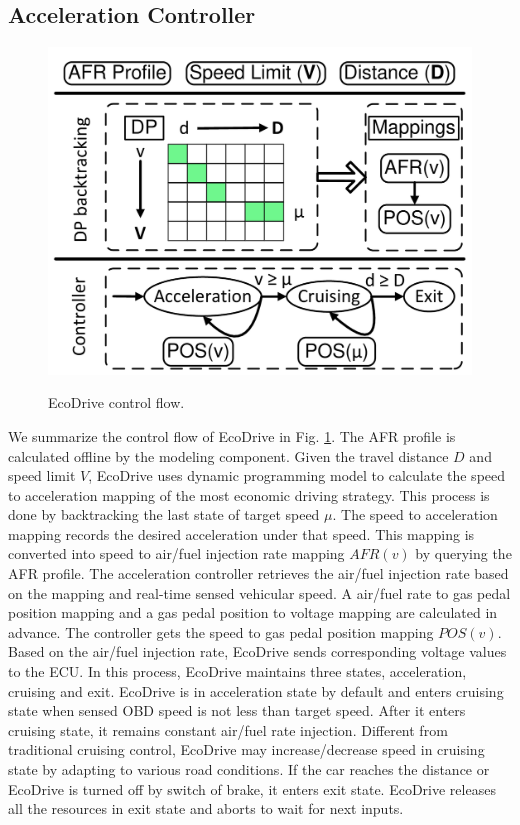 \subsection{Acceleration Controller}


\begin{figure}[ht]
\begin{center}
\vspace{-0.2cm}
\includegraphics[width=4.5in,angle=0]{Figs/EcoDrive/controlflow.pdf}
\vspace{-0.0cm}
\caption{EcoDrive control flow.}
\vspace{-0.5cm}
\label{controlflow}
\end{center}
\end{figure}



We summarize the control flow of EcoDrive in Fig. \ref{controlflow}. 
The AFR profile is calculated offline by the modeling component. 
Given the travel distance $D$ and speed limit $V$, 
EcoDrive uses dynamic programming model to calculate the speed
to acceleration mapping of the most economic driving strategy. 
This process is done by backtracking the last state of target speed $\mu$. 
The speed to acceleration mapping records the desired
acceleration under that speed. 
This mapping is converted into speed to air/fuel injection rate
mapping $AFR(v)$ by querying the AFR profile. 
The acceleration controller retrieves the air/fuel injection
rate based on the mapping and real-time sensed vehicular speed. 
A air/fuel rate to gas pedal position mapping and 
a gas pedal position to voltage mapping are calculated in advance.
The controller gets the speed to gas pedal position mapping $POS(v)$.  
Based on the air/fuel injection rate, EcoDrive sends 
corresponding voltage values to the ECU. 
In this process, EcoDrive maintains three states, 
acceleration, cruising and exit. 
EcoDrive is in acceleration state by default and enters
cruising state when sensed OBD speed is not less than target speed. 
After it enters cruising state, it remains constant air/fuel
rate injection. 
Different from traditional cruising control, 
EcoDrive may increase/decrease speed in cruising state
by adapting to various road conditions. 
If the car reaches the distance or EcoDrive is turned off
by switch of brake, it enters exit state. 
EcoDrive releases all the resources in exit state
and aborts to wait for next inputs. 


